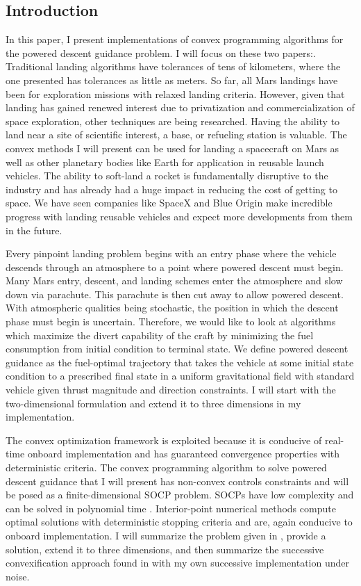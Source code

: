 \documentclass[journal]{new-aiaa}
\begin{document}
\begin{singlespace}
\section{Introduction}
In this paper, I present implementations of convex programming algorithms for the powered descent guidance problem. I will focus on these two papers:\cite{ploen2007}\cite{enhancements2008}. Traditional landing algorithms have tolerances of tens of kilometers, where the one presented has tolerances as little as meters. So far, all Mars landings have been for exploration missions with relaxed landing criteria. However, given that landing has gained renewed interest due to privatization and commercialization of space exploration, other techniques are being researched. Having the ability to land near a site of scientific interest, a base, or refueling station is valuable. The convex methods I will present can be used for landing a spacecraft on Mars as well as other planetary bodies like Earth for application in reusable launch vehicles. The ability to soft-land a rocket is fundamentally disruptive to the industry and has already had a huge impact in reducing the cost of getting to space. We have seen companies like SpaceX and Blue Origin make incredible progress with landing reusable vehicles and expect more developments from them in the future.

Every pinpoint landing problem begins with an entry phase where the vehicle descends through an atmosphere to a point where powered descent must begin. Many Mars entry, descent, and landing schemes enter the atmosphere and slow down via parachute. This parachute is then cut away to allow powered descent. With atmospheric qualities being stochastic, the position in which the descent phase must begin is uncertain. Therefore, we would like to look at algorithms which maximize the divert capability of the craft by minimizing the fuel consumption from initial condition to terminal state. We define powered descent guidance as the fuel-optimal trajectory that takes the vehicle at some initial state condition to a prescribed final state in a uniform gravitational field with standard vehicle given thrust magnitude and direction constraints. I will start with the two-dimensional formulation and extend it to three dimensions in my implementation.

The convex optimization framework is exploited because it is conducive of real-time onboard implementation and has guaranteed convergence properties with deterministic criteria. The convex programming algorithm to solve powered descent guidance that I will present has non-convex controls constraints and will be posed as a finite-dimensional SOCP problem. SOCPs have low complexity and can be solved in polynomial time \citep{boyd}. Interior-point numerical methods compute optimal solutions with deterministic stopping criteria and are, again conducive to onboard implementation.  I will summarize the problem given in \citep{ploen2007}, provide a solution, extend it to three dimensions, and then summarize the successive convexification approach found in \citep{becet2016} with my own successive implementation under noise.


\end{singlespace}
\end{document}
